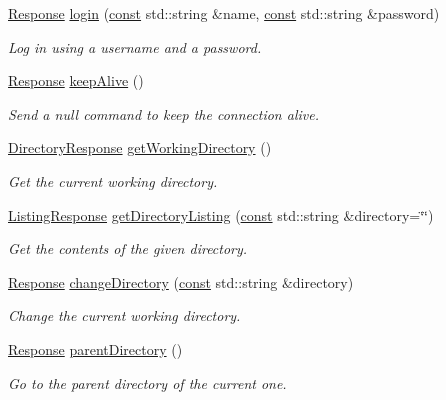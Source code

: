 \begin{DoxyCompactItemize}
\hyperlink{classsf_1_1_ftp_1_1_response}{Response} \hyperlink{classsf_1_1_ftp_a99d8114793c1659e9d51d45cecdcd965}{login} (\hyperlink{term__entry_8h_a57bd63ce7f9a353488880e3de6692d5a}{const} std\-::string \&name, \hyperlink{term__entry_8h_a57bd63ce7f9a353488880e3de6692d5a}{const} std\-::string \&password)
\begin{DoxyCompactList}\small\item\em Log in using a username and a password. \end{DoxyCompactList}\item 
\hyperlink{classsf_1_1_ftp_1_1_response}{Response} \hyperlink{classsf_1_1_ftp_aa1127d442b4acb2105aa8060a39d04fc}{keep\-Alive} ()
\begin{DoxyCompactList}\small\item\em Send a null command to keep the connection alive. \end{DoxyCompactList}\item 
\hyperlink{classsf_1_1_ftp_1_1_directory_response}{Directory\-Response} \hyperlink{classsf_1_1_ftp_a79c654fcdd0c81e68c4fa29af3b45e0c}{get\-Working\-Directory} ()
\begin{DoxyCompactList}\small\item\em Get the current working directory. \end{DoxyCompactList}\item 
\hyperlink{classsf_1_1_ftp_1_1_listing_response}{Listing\-Response} \hyperlink{classsf_1_1_ftp_a8f37258e461fcb9e2a0655e9df0be4a0}{get\-Directory\-Listing} (\hyperlink{term__entry_8h_a57bd63ce7f9a353488880e3de6692d5a}{const} std\-::string \&directory=\char`\"{}\char`\"{})
\begin{DoxyCompactList}\small\item\em Get the contents of the given directory. \end{DoxyCompactList}\item 
\hyperlink{classsf_1_1_ftp_1_1_response}{Response} \hyperlink{classsf_1_1_ftp_a7e93488ea6330dd4dd76e428da9bb6d3}{change\-Directory} (\hyperlink{term__entry_8h_a57bd63ce7f9a353488880e3de6692d5a}{const} std\-::string \&directory)
\begin{DoxyCompactList}\small\item\em Change the current working directory. \end{DoxyCompactList}\item 
\hyperlink{classsf_1_1_ftp_1_1_response}{Response} \hyperlink{classsf_1_1_ftp_ad295cf77f30f9ad07b5c401fd9849189}{parent\-Directory} ()
\begin{DoxyCompactList}\small\item\em Go to the parent directory of the current one. \end{DoxyCompactList}\item 

\end{DoxyCompactItemize}
